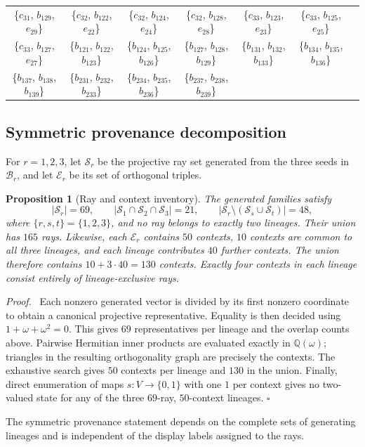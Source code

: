 \documentclass[%
  reprint,
  superscriptaddress,
  showpacs,
  showkeys,
  amsmath,amssymb,
  pra,
  longbibliography,
  floatfix,
  x11names
]{revtex4-2}
\newenvironment{revision}{\begingroup}{\endgroup}
\newtheorem{proposition}{Proposition}
\newenvironment{proof}{\par\noindent\textit{Proof.}\ }{\hfill$\square$\par}
\begin{document}
\begin{table}[htbp!]
\begin{ruledtabular}
\begin{tabular}{ccccccc}
\{$c_{31}$, $b_{129}$, $e_{29}$\} & \{$c_{32}$, $b_{122}$, $e_{22}$\} & \{$c_{32}$, $b_{124}$, $e_{24}$\} & \{$c_{32}$, $b_{128}$, $e_{28}$\} & \{$c_{33}$, $b_{123}$, $e_{23}$\} & \{$c_{33}$, $b_{125}$, $e_{25}$\} \\
\{$c_{33}$, $b_{127}$, $e_{27}$\} & \{$b_{121}$, $b_{122}$, $b_{123}$\} & \{$b_{124}$, $b_{125}$, $b_{126}$\} & \{$b_{127}$, $b_{128}$, $b_{129}$\} & \{$b_{131}$, $b_{132}$, $b_{133}$\} & \{$b_{134}$, $b_{135}$, $b_{136}$\} \\
\{$b_{137}$, $b_{138}$, $b_{139}$\} & \{$b_{231}$, $b_{232}$, $b_{233}$\} & \{$b_{234}$, $b_{235}$, $b_{236}$\} & \{$b_{237}$, $b_{238}$, $b_{239}$\} & & \\
\end{tabular}
\end{ruledtabular}
\end{table}

\begin{revision}
\subsection{Symmetric provenance decomposition}

For $r=1,2,3$, let $\mathcal{S}_r$ be the projective ray set generated from the three seeds in $\mathcal{B}_r$, and let $\mathcal{E}_r$ be its set of orthogonal triples.

\begin{proposition}[Ray and context inventory]
\label{prop:provenance}
The generated families satisfy
\[
|\mathcal{S}_r|=69,\qquad
|\mathcal{S}_1\cap\mathcal{S}_2\cap\mathcal{S}_3|=21,
\qquad |\mathcal{S}_r\setminus(\mathcal{S}_s\cup\mathcal{S}_t)|=48,
\]
where $\{r,s,t\}=\{1,2,3\}$, and no ray belongs to exactly two lineages.  Their union has $165$
rays.  Likewise, each $\mathcal{E}_r$ contains $50$ contexts, $10$ contexts are common to all three lineages, and each lineage contributes $40$ further contexts.  The union therefore contains $10+3\cdot40=130$ contexts.  Exactly four contexts in each lineage consist entirely of lineage-exclusive rays.
\end{proposition}

\begin{proof}
Each nonzero generated vector is divided by its first nonzero coordinate to obtain a canonical projective representative.  Equality is then decided using $1+\omega+\omega^2=0$.  This gives $69$ representatives per lineage and the overlap counts above.  Pairwise Hermitian inner products are evaluated exactly in $\mathbb{Q}(\omega)$; triangles in the resulting orthogonality graph are precisely the contexts.  The exhaustive search gives $50$ contexts per lineage and $130$ in the union.  Finally, direct enumeration of maps $s:V\to\{0,1\}$ with one $1$ per context gives no two-valued state for any of the three $69$-ray, $50$-context lineages.
\end{proof}

The symmetric provenance statement depends on the complete sets of generating lineages and is independent of the display labels assigned to the rays.
\end{revision}
\end{document}
